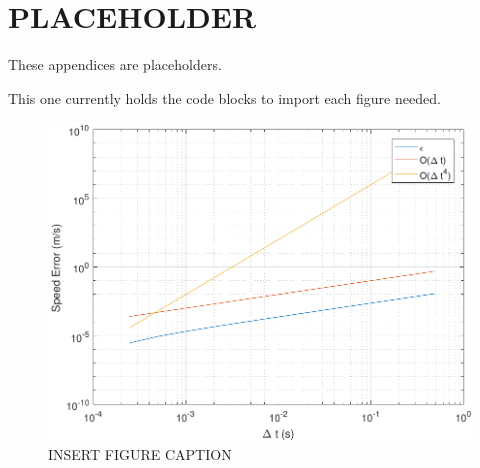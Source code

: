 \appendices
%
%
 

\chapter{PLACEHOLDER}

These appendices are placeholders.

This one currently holds the code blocks to import each figure needed.
















\begin{figure}[H]
	\centering
	\begin{minipage}{4.5 in}
		\includegraphics[width=\linewidth]{Figures/convtestatmo.pdf}
		\caption{INSERT FIGURE CAPTION \label{fig:convtestatmo} }
	\end{minipage}
\end{figure}



